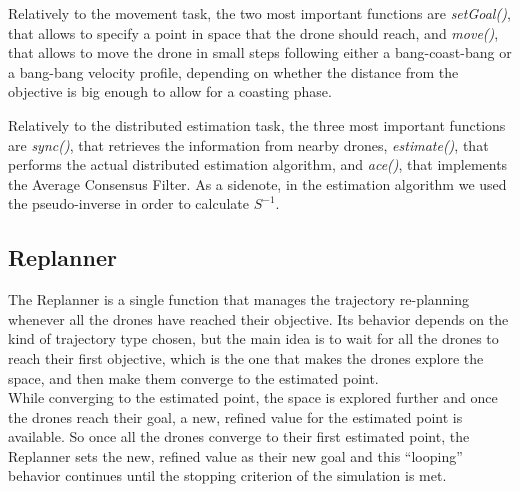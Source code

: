 Relatively to the movement task, the two most important functions are \textit{setGoal()}, that allows to specify a point in space that the drone should reach, and \textit{move()}, that allows to move the drone in small steps following either a bang-coast-bang or a bang-bang velocity profile, depending on whether the distance from the objective is big enough to allow for a coasting phase. 

Relatively to the distributed estimation task, the three most important functions are \textit{sync()}, that retrieves the information from nearby drones, \textit{estimate()}, that performs the actual distributed estimation algorithm, and \textit{ace()}, that implements the Average Consensus Filter. As a sidenote, in the estimation algorithm we used the pseudo-inverse in order to calculate $S^{-1}$.

\subsection{Replanner}
The Replanner is a single function that manages the trajectory re-planning whenever all the drones have reached their objective. Its behavior depends on the kind of trajectory type chosen, but the main idea is to wait for all the drones to reach their first objective, which is the one that makes the drones explore the space, and then make them converge to the estimated point.\\ 
While converging to the estimated point, the space is explored further and once the drones reach their goal, a new, refined value for the estimated point is available. So once all the drones converge to their first estimated point, the Replanner sets the new, refined value as their new goal and this “looping” behavior continues until the stopping criterion of the simulation is met. 

